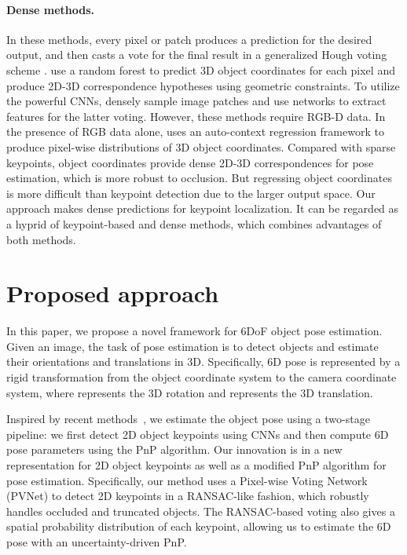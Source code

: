 \documentclass[10pt,twocolumn,letterpaper]{article}
\begin{document}
\paragraph{Dense methods.} In these methods, every pixel or patch produces a prediction for the desired output, and then casts a vote for the final result in a generalized Hough voting scheme \cite{liebelt2008independent, sun2010depth, glasner2011aware}. \cite{brachmann2014learning, michel2017global} use a random forest to predict 3D object coordinates for each pixel and produce 2D-3D correspondence hypotheses using geometric constraints. To utilize the powerful CNNs, \cite{kehl2016deep, doumanoglou2016recovering} densely sample image patches and use networks to extract features for the latter voting. 
However, these methods require RGB-D data. 
In the presence of RGB data alone, \cite{brachmann2016uncertainty} uses an auto-context regression framework \cite{tu2010auto} to produce pixel-wise distributions of 3D object coordinates. 
Compared with sparse keypoints, object coordinates provide dense 2D-3D correspondences for pose estimation, which is more robust to occlusion. But regressing object coordinates is more difficult than keypoint detection due to the larger output space. Our approach makes dense predictions for keypoint localization. It can be regarded as a hyprid of keypoint-based and dense methods, which combines advantages of both methods.
 \section{Proposed approach}



In this paper, we propose a novel framework for 6DoF object pose estimation. Given an image, the task of pose estimation is to detect objects and estimate their orientations and translations in 3D. Specifically, 6D pose is represented by a rigid transformation  from the object coordinate system to the camera coordinate system, where  represents the 3D rotation and  represents the 3D translation.

Inspired by recent methods~\cite{pavlakos20176, rad2017bb8, tekin2018real}, we estimate the object pose using a two-stage pipeline: we first detect 2D object keypoints using CNNs and then compute 6D pose parameters using the PnP algorithm. Our innovation is in a new representation for 2D object keypoints as well as a modified PnP algorithm for pose estimation. Specifically, our method uses a Pixel-wise Voting Network (PVNet) to detect 2D keypoints in a RANSAC-like fashion, which robustly handles occluded and truncated objects. The RANSAC-based voting also gives a spatial probability distribution of each keypoint, allowing us to estimate the 6D pose with an uncertainty-driven PnP.
\end{document}
